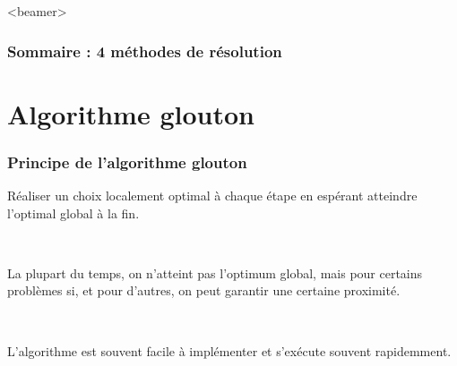 \documentclass{beamer}
\begin{document}
\begin{frame}<beamer>
  \frametitle{Sommaire : 4 méthodes de résolution}
  \tableofcontents[sections={2,3,5,6}]
\end{frame}

\section{Algorithme glouton}

\begin{frame}
  \frametitle{Principe de l'algorithme glouton}

  Réaliser un choix localement optimal à chaque étape en espérant atteindre
  l'optimal global à la fin.

  ~
  
  La plupart du temps, on n'atteint pas l'optimum global, mais pour certains
  problèmes si, et pour d'autres, on peut garantir une certaine proximité. 

  

  ~
  
  L'algorithme est souvent facile à implémenter et s'exécute souvent rapidemment. 
  
\end{frame}
\end{document}
